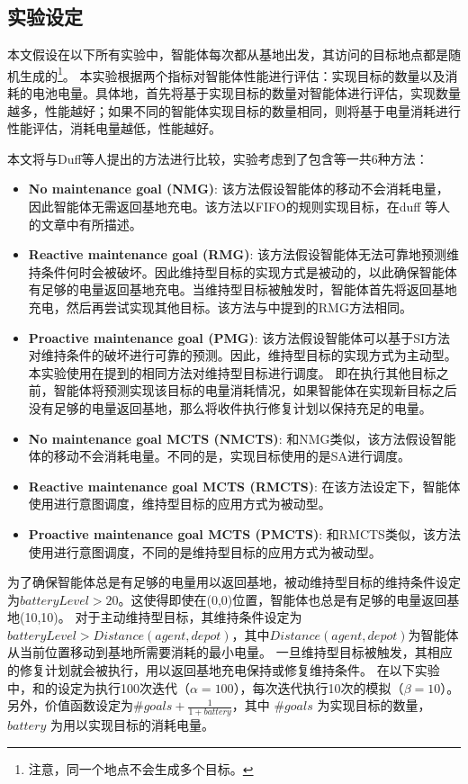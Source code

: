 \subsection{实验设定}
本文假设在以下所有实验中，智能体每次都从基地出发，其访问的目标地点都是随机生成的\footnote{注意，同一个地点不会生成多个目标。}。
本实验根据两个指标对智能体性能进行评估：实现目标的数量以及消耗的电池电量。具体地，首先将基于实现目标的数量对智能体进行评估，实现数量越多，性能越好；如果不同的智能体实现目标的数量相同，则将基于电量消耗进行性能评估，消耗电量越低，性能越好。

本文将\SAM 与Duff等人提出的方法\cite{DBLP:conf/atal/DuffHT06}进行比较，实验考虑到了包含\SAM 等一共6种方法：

\begin{itemize}
\item \textbf{No maintenance goal (NMG)}: 该方法假设智能体的移动不会消耗电量，因此智能体无需返回基地充电。该方法以FIFO的规则实现目标，在duff 等人的文章\cite{DBLP:conf/atal/DuffHT06}中有所描述。
\item \textbf{Reactive maintenance goal (RMG)}: 该方法假设智能体无法可靠地预测维持条件何时会被破坏。因此维持型目标的实现方式是被动的，以此确保智能体有足够的电量返回基地充电。当维持型目标被触发时，智能体首先将返回基地充电，然后再尝试实现其他目标。该方法与\cite{DBLP:conf/atal/DuffHT06}中提到的RMG方法相同。
\item \textbf{Proactive maintenance goal (PMG)}: 该方法假设智能体可以基于SI方法对维持条件的破坏进行可靠的预测。因此，维持型目标的实现方式为主动型。本实验使用在\cite{DBLP:conf/atal/DuffHT06}提到的相同方法对维持型目标进行调度。
即在执行其他目标之前，智能体将预测实现该目标的电量消耗情况，如果智能体在实现新目标之后没有足够的电量返回基地，那么将收件执行修复计划以保持充足的电量。

\item \textbf{No maintenance goal MCTS (NMCTS)}: 和NMG类似，该方法假设智能体的移动不会消耗电量。不同的是，实现目标使用的是SA进行调度。
\item \textbf{Reactive maintenance goal MCTS (RMCTS)}: 在该方法设定下，智能体使用\SAM 进行意图调度，维持型目标的应用方式为被动型。
\item \textbf{Proactive maintenance goal MCTS (PMCTS)}: 和RMCTS类似，该方法使用\SAM 进行意图调度，不同的是维持型目标的应用方式为被动型。
\end{itemize}

%
为了确保智能体总是有足够的电量用以返回基地，被动维持型目标的维持条件设定为$batteryLevel > 20$。这使得即使在(0,0)位置，智能体也总是有足够的电量返回基地(10,10)。
%
对于主动维持型目标，其维持条件设定为$batteryLevel > Distance(agent, depot)$，其中$Distance(agent, depot)$为智能体从当前位置移动到基地所需要消耗的最小电量。
%
一旦维持型目标被触发，其相应的修复计划就会被执行，用以返回基地充电保持或修复维持条件。
%
在以下实验中，\SAM 和\SA 的设定为执行100次迭代（$\alpha = 100$），每次迭代执行10次的模拟（$\beta = 10$）。另外，价值函数设定为$\#goals + \frac{1}{1 + {battery}}$，其中 $\#goals$ 为实现目标的数量， $battery$ 为用以实现目标的消耗电量。

